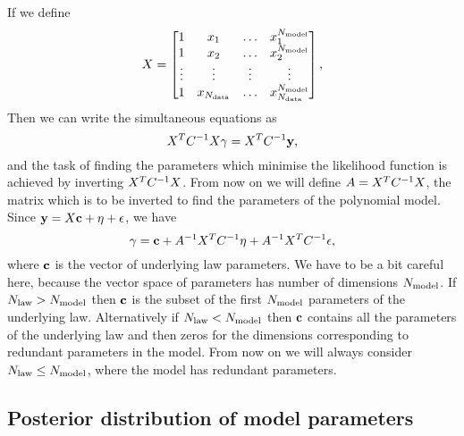 If we define
\begin{equation}
    X =
    \begin{bmatrix}
        1  & x_1 & \ldots& x_1^{N_{\rm model}} \\ 
        1  & x_2 & \ldots& x_2^{N_{\rm model}} \\ 
        \vdots  & \vdots & \vdots& \vdots \\ 
        1  & x_{N_{\rm data}} & \ldots & x_{N_{\rm data}}^{N_{\rm model}} 
    \end{bmatrix},
\end{equation}
Then we can write the simultaneous equations as
\begin{equation}
    X^T C^{-1}_{} X \mathbf{\gamma} = X^T C^{-1}_{} \mathbf{y},
\end{equation}
and the task of finding the parameters which minimise the likelihood function is
achieved by inverting $X^T C^{-1}_{} X$. From now on we will define
$A = X^T C^{-1}_{} X$, the matrix which is to be inverted to find the parameters
of the polynomial model.
Since $\mathbf{y} = X \mathbf{c} + \mathbf{\eta} + \mathbf{\epsilon}$, we have
\begin{equation}\label{eq:polymodelparam}
    \mathbf{\gamma} = \mathbf{c} + A^{-1} X^T C^{-1}_{} \mathbf{\eta} + A^{-1} X^T C^{-1}_{} \mathbf{\epsilon},
\end{equation}
where $\mathbf{c}$ is the vector of underlying law parameters. We have to be a bit
careful here, because the vector space of parameters has number of dimensions
$N_{\rm model}$. If $N_{\rm law} > N_{\rm model}$ then $\mathbf{c}$ is the subset of the first
$N_{\rm model}$ parameters of the underlying law. Alternatively if $N_{\rm law} < N_{\rm model}$
then $\mathbf{c}$ contains all the parameters of the underlying law and then zeros
for the dimensions corresponding to redundant parameters in the model. From
now on we will always consider $N_{\rm law} \leq N_{\rm model}$, where the model has
redundant parameters.

\subsection{Posterior distribution of model parameters}

